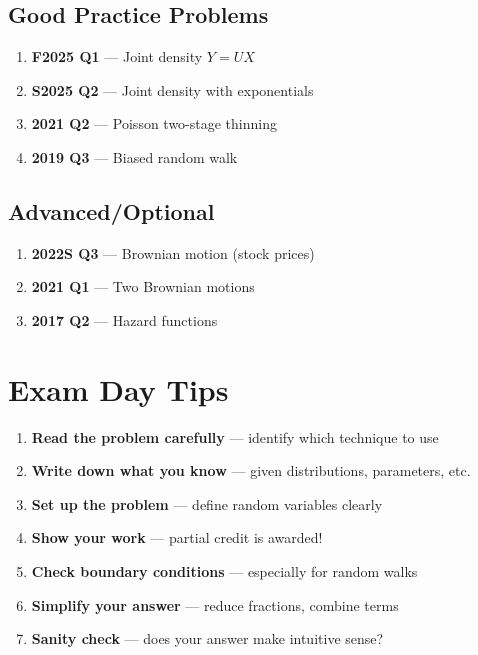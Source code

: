 \documentclass[11pt,letterpaper]{article}
\begin{document}
\subsection{Good Practice Problems}

\begin{enumerate}[leftmargin=*,start=7]
  \item \textbf{F2025 Q1} --- Joint density $Y = UX$
  \item \textbf{S2025 Q2} --- Joint density with exponentials
  \item \textbf{2021 Q2} --- Poisson two-stage thinning
  \item \textbf{2019 Q3} --- Biased random walk
\end{enumerate}

\subsection{Advanced/Optional}

\begin{enumerate}[leftmargin=*,start=11]
  \item \textbf{2022S Q3} --- Brownian motion (stock prices)
  \item \textbf{2021 Q1} --- Two Brownian motions
  \item \textbf{2017 Q2} --- Hazard functions
\end{enumerate}

\newpage

\section{Exam Day Tips}

\begin{enumerate}[leftmargin=*]
  \item \textbf{Read the problem carefully} --- identify which technique to use
  \item \textbf{Write down what you know} --- given distributions, parameters, etc.
  \item \textbf{Set up the problem} --- define random variables clearly
  \item \textbf{Show your work} --- partial credit is awarded!
  \item \textbf{Check boundary conditions} --- especially for random walks
  \item \textbf{Simplify your answer} --- reduce fractions, combine terms
  \item \textbf{Sanity check} --- does your answer make intuitive sense?
\end{enumerate}
\end{document}
